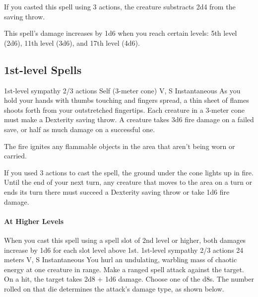         If you casted this spell using 3 actions, the creature substracts 2d4 from the saving throw.

        This spell's damage increases by 1d6 when you reach certain levels: 5th level (2d6), 11th level (3d6), and 17th level (4d6).
\subsection*{1st-level Spells}
        {1st-level sympathy}
        {2/3 actions}
        {Self (3-meter cone)}
        {V, S}
        {Instantaneous}
        As you hold your hands with thumbs touching and fingers spread, a thin sheet of flames shoots forth from your outstretched fingertips.
        Each creature in a 3-meter cone must make a Dexterity saving throw.
        A creature takes 3d6 fire damage on a failed save, or half as much damage on a successful one.

        The fire ignites any flammable objects in the area that aren't being worn or carried.

        If you used 3 actions to cast the spell, the ground under the cone lights up in fire.
        Until the end of your next turn, any creature that moves to the area on a turn or ends its turn there must succeed a Dexterity saving throw or take 1d6 fire damage.

        \paragraph{At Higher Levels} When you cast this spell using a spell slot of 2nd level or higher, both damages increase by 1d6 for each slot level above 1st.
        {1st-level sympathy}
        {2/3 actions}
        {24 meters}
        {V, S}
        {Instantaneous}
        You hurl an undulating, warbling mass of chaotic energy at one creature in range.
        Make a ranged spell attack against the target.
        On a hit, the target takes 2d8 + 1d6 damage.
        Choose one of the d8s.
        The number rolled on that die determines the attack's damage type, as shown below.

